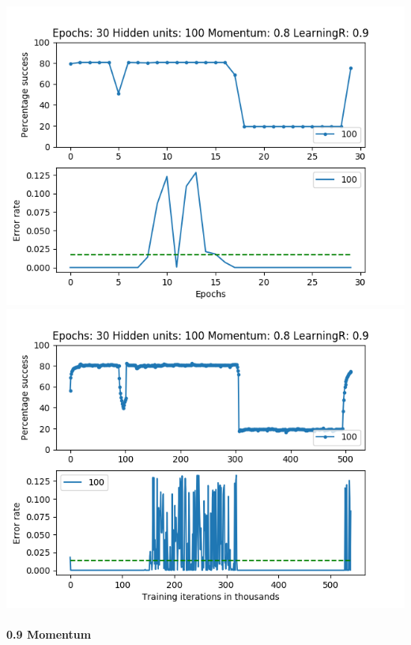 \documentclass[11pt]{article}
\makeatletter
\def\maxwidth{\ifdim\Gin@nat@width>\linewidth\linewidth
    \else\Gin@nat@width\fi}
\let\Oldincludegraphics\includegraphics
\renewcommand{\includegraphics}[1]{\Oldincludegraphics[width=.8\maxwidth]{#1}}
\makeatother
\begin{document}
\includegraphics{Experiment2/E2_NN_Epoch_Momentum_0.8_30Epochs_100Hiddenunits.png}
\includegraphics{Experiment2/E2_NN_Training_Momentum_0.8_30Epochs_100Hiddenunits.png}

\hypertarget{momentum-9}{%
\paragraph{0.9 Momentum}\label{momentum-9}}
\end{document}

